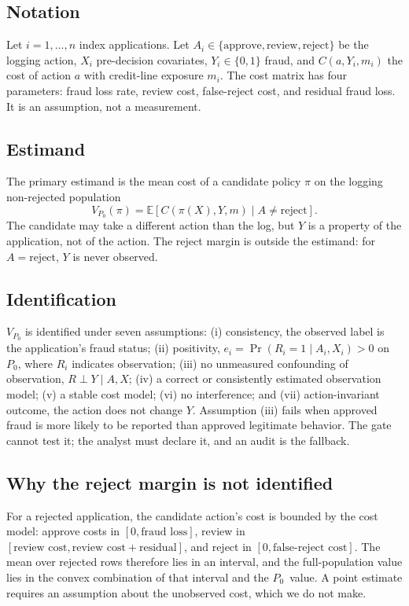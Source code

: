 \documentclass[conference]{IEEEtran}
\newcommand{\Pzero}{\ensuremath{P_0}}
\begin{document}
\subsection{Notation}
Let $i=1,\dots,n$ index applications. Let $A_i\in\{\text{approve},\text{review},\text{reject}\}$ be the logging action, $X_i$ pre-decision covariates, $Y_i\in\{0,1\}$ fraud, and $C(a,Y_i,m_i)$ the cost of action $a$ with credit-line exposure $m_i$. The cost matrix has four parameters: fraud loss rate, review cost, false-reject cost, and residual fraud loss. It is an assumption, not a measurement.

\subsection{Estimand}
The primary estimand is the mean cost of a candidate policy $\pi$ on the logging non-rejected population
\begin{equation}
V_{\Pzero}(\pi)=\mathbb{E}\left[C(\pi(X),Y,m)\mid A\neq\text{reject}\right].
\end{equation}
The candidate may take a different action than the log, but $Y$ is a property of the application, not of the action. The reject margin is outside the estimand: for $A=\text{reject}$, $Y$ is never observed.

\subsection{Identification}
$V_{\Pzero}$ is identified under seven assumptions: (i) consistency, the observed label is the application's fraud status; (ii) positivity, $e_i=\Pr(R_i=1\mid A_i,X_i)>0$ on \Pzero, where $R_i$ indicates observation; (iii) no unmeasured confounding of observation, $R\perp Y\mid A,X$; (iv) a correct or consistently estimated observation model; (v) a stable cost model; (vi) no interference; and (vii) action-invariant outcome, the action does not change $Y$. Assumption (iii) fails when approved fraud is more likely to be reported than approved legitimate behavior. The gate cannot test it; the analyst must declare it, and an audit is the fallback.

\subsection{Why the reject margin is not identified}
For a rejected application, the candidate action's cost is bounded by the cost model: approve costs in $[0,\text{fraud loss}]$, review in $[\text{review cost},\text{review cost}+\text{residual}]$, and reject in $[0,\text{false-reject cost}]$. The mean over rejected rows therefore lies in an interval, and the full-population value lies in the convex combination of that interval and the \Pzero\ value. A point estimate requires an assumption about the unobserved cost, which we do not make.
\end{document}
